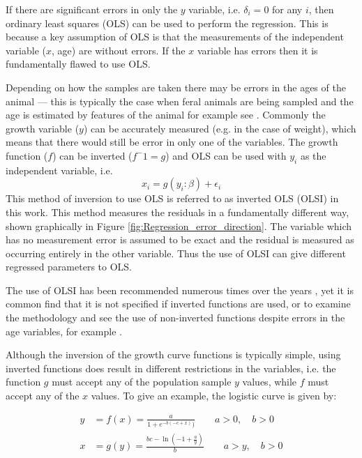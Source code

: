 \documentclass[12pt,a4paper]{article}
\begin{document}
	If there are significant errors in only the $y$ variable, i.e. $\delta_i=0$ for any $i$, then ordinary least squares (OLS) can be used to perform the regression. 	This is because a key assumption of OLS is that the measurements of the independent variable ($x$, age)  are without errors. If the  $x$ variable has errors then it is fundamentally flawed to use OLS. 
	
	Depending on how the samples are taken there may be errors in the ages of the animal --- this is typically the case when feral animals are being sampled and the age is estimated by features of the animal for example see \textcite{Mayberry2018}. Commonly the growth variable ($y$) can be accurately measured (e.g. in the case of weight), which means that there would still be error in only one of the variables. The growth function ($f$) can be inverted ($f^-1=g$) and OLS can be used with $y_i$ as the independent variable, i.e. 
	\begin{equation}
	x_i = g(y_i:\beta)+\epsilon_i
	\end{equation}
	This method of inversion to use OLS is referred to as inverted OLS (OLSI) in this work. This method measures the residuals in a fundamentally different way, shown graphically in Figure \ref{fig:Regression_error_direction}. The variable which has no measurement error is assumed to be exact and the residual is measured as occurring entirely in the other variable. Thus the use of OLSI can give different regressed parameters to OLS.
	
	The use of OLSI has been recommended numerous times over the years \parencite{Myhrvold2013,Kaufmann1981}, yet it is common find that it is not specified if inverted functions are used, or to examine the methodology and see the use of non-inverted functions despite errors in the age variables, for example \textcite{Erickson2015}.
	
	Although the inversion of the growth curve functions is typically simple, using inverted functions does result in different restrictions in the variables, i.e. the function $g$ must accept any of the population sample $y$ values, while $f$ must accept any of the $x$ values. To give an example, the logistic curve is given by:
	
	\begin{align}
		y &= f(x) = \frac{a}{1+e^{-b(-c+x)})} \qquad a>0,\quad b>0\\
		x &= g(y) = \frac{bc-\ln(-1+\frac{a}{y})}{b} \qquad a>y,\quad b>0
	\end{align}
	
\end{document}
